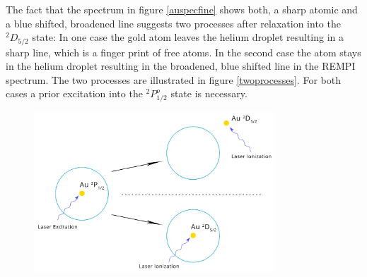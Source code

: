 \documentclass[parskip,12pt,headsepline,a4paper] {scrbook}
\begin{document}
The fact that the spectrum in figure \ref{auspecfine} shows both, a sharp atomic and a blue shifted, broadened line suggests two processes after relaxation into the $^2D_{5/2}$ state: In one case the gold atom leaves the helium droplet resulting in a sharp line, which is a finger print of free atoms. In the second case the atom stays in the helium droplet resulting in the broadened, blue shifted line in the REMPI spectrum. The two processes are illustrated in figure \ref{twoprocesses}. For both cases a prior excitation into the $^2P^o_{1/2}$ state is necessary.

\begin{figure}[ht]
\centerline{
\includegraphics[width=9cm]{./results/Au_states.jpg}}
\end{figure}
\end{document}
